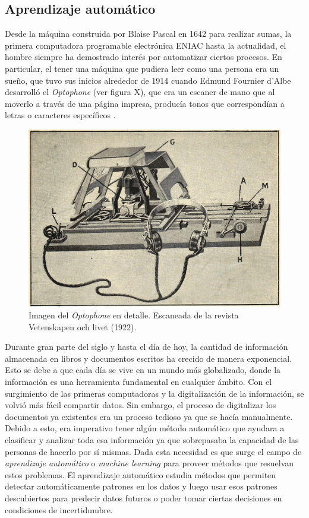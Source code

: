 \subsection{Aprendizaje automático}

	Desde la máquina construida por Blaise Pascal en 1642 para realizar sumas, la primera computadora programable electrónica ENIAC hasta la actualidad, el hombre siempre ha demostrado interés por automatizar ciertos procesos. En particular, el tener una máquina que pudiera leer como una persona era un sueño, que tuvo sus inicios alrededor de 1914 cuando Edmund Fournier d'Albe desarrolló el \textit{Optophone} (ver figura X), que era un escaner de mano que al moverlo a través de una página impresa, producía tonos que correspondían	a letras o caracteres específicos \cite{EFdAlbe}.

			\begin{figure}[htbp]
				\centering
				\centerline{
					\includegraphics[scale=1]{img/Optophone.jpg}
				}
				\caption[Optophone]{Imagen del \textit{Optophone} en detalle. Escaneada de la revista Vetenskapen och livet (1922).}
				\label{fig: Optophone}
			\end{figure}
			
	Durante gran parte del siglo  y hasta el día de hoy, la cantidad de información almacenada en libros y documentos escritos ha crecido de manera exponencial. Esto se debe a que cada día se vive en un mundo más globalizado, donde la información es una herramienta fundamental en cualquier ámbito. Con el surgimiento de las primeras computadoras y la digitalización de la información, se volvió más fácil compartir datos. Sin embargo, el proceso de digitalizar los documentos ya existentes era un proceso tedioso ya que se hacía manualmente. Debido a esto, era imperativo tener algún método automático que ayudara a clasificar y analizar toda esa información ya que sobrepasaba la capacidad de las personas de hacerlo por sí mismas. Dada esta necesidad es que surge el campo de \textit{aprendizaje automático} o \textit{machine learning} para proveer métodos que resuelvan estos problemas. El aprendizaje automático estudia métodos que permiten detectar automáticamente patrones en los datos y luego usar esos patrones descubiertos para predecir datos futuros o poder tomar ciertas decisiones en condiciones de incertidumbre. 
	
